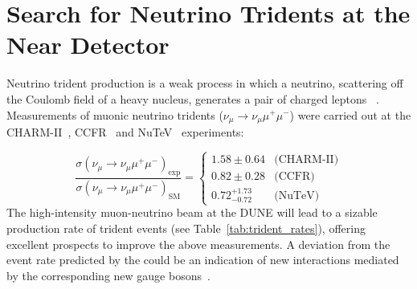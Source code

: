 \section{Search for Neutrino Tridents at the Near Detector}


Neutrino trident production is a weak process in which a neutrino, scattering off the Coulomb field of a heavy nucleus, generates a pair of charged leptons ~\cite{Czyz:1964zz,Lovseth:1971vv,Fujikawa:1971nx,Koike:1971tu,Koike:1971vg,Brown:1973ih,Belusevic:1987cw}. Measurements of muonic neutrino tridents ($\nu_\mu \to \nu_\mu \mu^+\mu^-$) were carried out at the CHARM-II~\cite{Geiregat:1990gz}, CCFR~\cite{Mishra:1991bv} and NuTeV~\cite{Adams:1999mn} experiments:


\[
\frac{\sigma(\nu_\mu \to \nu_\mu \mu^+\mu^-)_\text{exp}}{\sigma(\nu_\mu \to \nu_\mu \mu^+\mu^-)_\text{SM}} = 
\begin{cases}
1.58 \pm 0.64         & \text{(CHARM-II)} \\ 
0.82 \pm 0.28         & \text{(CCFR)} \\
0.72 ^{+1.73}_{-0.72} & \text{(NuTeV)} 
\end{cases}
\]
The high-intensity muon-neutrino beam at the DUNE   will lead to a sizable production rate of trident events (see Table~\ref{tab:trident_rates}), offering excellent prospects to improve the above measurements. A deviation from the event rate predicted by the  could be an indication of new interactions mediated by the corresponding new gauge bosons~\cite{Altmannshofer:2014pba}. 

